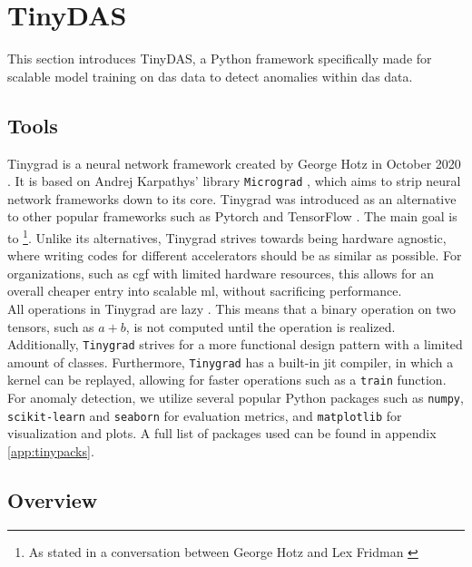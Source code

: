 \section{TinyDAS}

This section introduces TinyDAS, a Python framework specifically made for scalable model training on \acrshort{das} data to detect anomalies within \acrshort{das} data. 

\subsection{Tools}

Tinygrad is a neural network framework created by George Hotz in October 2020 \cite{tinygrad2020}. It is based on Andrej Karpathys' library \texttt{Micrograd} \cite{micrograd}, which aims to strip neural network frameworks down to its core. Tinygrad was introduced as an alternative to other popular frameworks such as Pytorch \cite{paszke2019pytorch} and TensorFlow \cite{abadi2016tensorflow}. The main goal is to  \footnote{As stated in a conversation between George Hotz and Lex Fridman \cite{LexClipsYouTube2023}}. Unlike its alternatives, Tinygrad strives towards being hardware agnostic, where writing codes for different accelerators should be as similar as possible. For organizations, such as \acrshort{cgf} with limited hardware resources, this allows for an overall cheaper entry into scalable \acrshort{ml}, without sacrificing performance. \\

All operations in Tinygrad are lazy \cite{tinygrad}. This means that a binary operation on two tensors, such as $a+b$, is not computed until the operation is realized. Additionally, \texttt{Tinygrad} strives for a more functional design pattern with a limited amount of classes. Furthermore, \texttt{Tinygrad} has a built-in \acrfull{jit} compiler, in which a kernel can be replayed, allowing for faster operations such as a \texttt{train} function. For anomaly detection, we utilize several popular Python packages such as \texttt{numpy}, \texttt{scikit-learn} and \texttt{seaborn} for evaluation metrics, and \texttt{matplotlib} for visualization and plots. A full list of packages used can be found in 
appendix \ref{app:tinypacks}.


\subsection{Overview}
\label{meth:tinyoverview}

